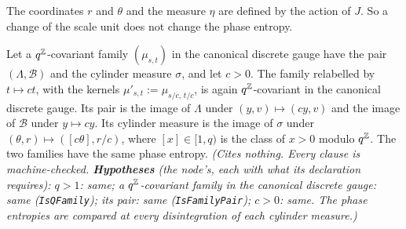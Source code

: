 The coordinates $r$ and $\theta$ and the measure $\eta$ are defined by the action of $J$. So a
change of the scale unit does not change the phase entropy.

\begin{proposition}
\label{prop:phase-entropy-scale-unit}
\leanok
{}
Let a $q^{\mathbb{Z}}$-covariant family $(\mu_{s,t})$ in the canonical discrete gauge have the pair
$(\Lambda, \mathcal{B})$ and the cylinder measure $\sigma$, and let $c > 0$. The family relabelled
by $t \mapsto ct$, with the kernels $\mu'_{s,t} := \mu_{s/c,\,t/c}$, is again $q^{\mathbb{Z}}$-covariant
in the canonical discrete gauge. Its pair is the image of $\Lambda$ under $(y, v) \mapsto (cy, v)$
and the image of $\mathcal{B}$ under $y \mapsto cy$. Its cylinder measure is the image of $\sigma$
under $(\theta, r) \mapsto ([c\theta], r/c)$, where $[x] \in [1,q)$ is the class of $x > 0$ modulo
$q^{\mathbb{Z}}$. The two families have the same phase entropy.
\statusT\quad\emph{(Cites nothing. Every clause is machine-checked.
\textbf{Hypotheses} (the node's, each with what its declaration requires): $q > 1$: same; a
$q^{\mathbb{Z}}$-covariant family in the canonical discrete gauge: same (\texttt{IsQFamily}); its pair:
same (\texttt{IsFamilyPair}); $c > 0$: same. The phase entropies are compared at every
disintegration of each cylinder measure.)}
\end{proposition}

